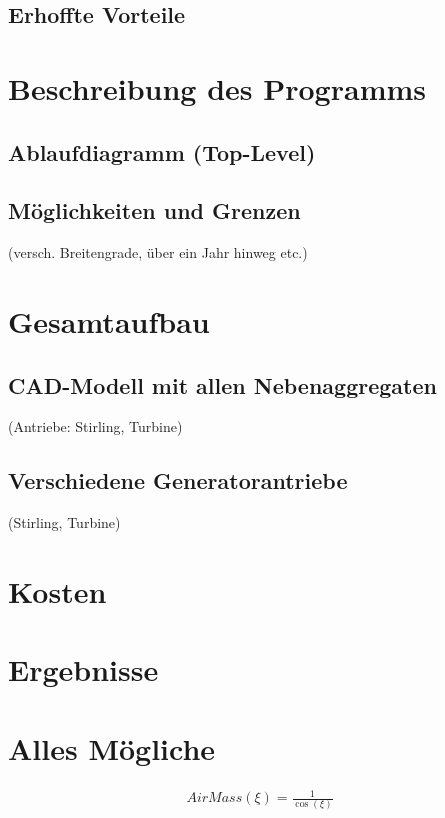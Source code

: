 \documentclass[fontsize=10pt,paper=a4,bibliography=totoc]{scrartcl}
\begin{document}
\subsection{Erhoffte Vorteile}

\section{Beschreibung des Programms}
\subsection{Ablaufdiagramm (Top-Level)}
\subsection{Möglichkeiten und Grenzen}
 (versch. Breitengrade, über ein Jahr hinweg etc.)
\section{Gesamtaufbau}
\subsection{CAD-Modell mit allen Nebenaggregaten}
 (Antriebe: Stirling, Turbine)
\subsection{Verschiedene Generatorantriebe}
 (Stirling, Turbine)
\section{Kosten}
\section{Ergebnisse}


\section{Alles Mögliche}

\begin{align*}
	AirMass(\xi)=\frac{1}{\cos(\xi)}
\end{align*}
\end{document}
